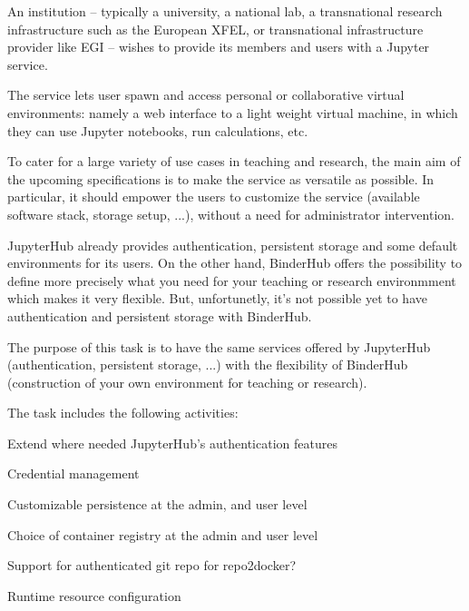\begin{task}[
  title=JupyterHub / BinderHub convergence,
  id=jh-bh-conv,
  lead=EP,
  PM=12,
  wphases={0-48},
  partners={EP,WTT}]

  An institution – typically a university, a national lab, a transnational
  research infrastructure such as the European XFEL, or transnational 
  infrastructure provider like EGI – wishes to provide its members and 
  users with a Jupyter service.

  The service lets user spawn and access personal or collaborative virtual
  environments: namely a web interface to a light weight virtual machine,
  in which they can use Jupyter notebooks, run calculations, etc.

  To cater for a large variety of use cases in teaching and research,
  the main aim of the upcoming specifications is to make the service as
  versatile as possible. In particular, it should empower the users to 
  customize the service (available software stack, storage setup, ...),
  without a need for administrator intervention.

  JupyterHub already provides authentication, persistent storage and some
  default environments for its users. On the other hand, BinderHub offers
  the possibility to define more precisely what you need for your teaching
  or research environmment which makes it very flexible. But, unfortunetly,
  it's not possible yet to have authentication and persistent storage with
  BinderHub.

  The purpose of this task is to have the same services offered by JupyterHub
  (authentication, persistent storage, ...) with the flexibility of BinderHub
  (construction of your own environment for teaching or research).

  The task includes the following activities:
  \begin{compactitem}
  \item Extend where needed JupyterHub's authentication features%
  \item Credential management
  \item Customizable persistence at the admin, and user level
  \item Choice of container registry at the admin and user level %
  \item Support for authenticated git repo for repo2docker? %
  \item Runtime resource configuration %
  \end{compactitem}

\end{task}
